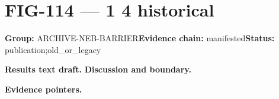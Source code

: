 \clearpage
\section{FIG-114 --- 1 4 historical}
\label{figpage:fig-114}
\textbf{Group:} ARCHIVE-NEB-BARRIER\quad \textbf{Evidence chain:} manifested\quad \textbf{Status:} publication;old\_or\_legacy

\textbf{Results text draft.} 
\textbf{Discussion and boundary.} 


\textbf{Evidence pointers.}



\vfill
